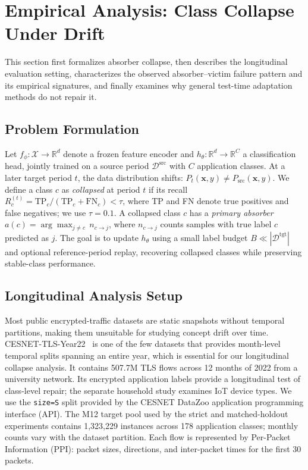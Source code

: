 \documentclass[journal]{IEEEtran}
\begin{document}
\section{Empirical Analysis: Class Collapse Under Drift}
\label{sec:analysis}

This section first formalizes absorber collapse, then describes the longitudinal evaluation setting, characterizes the observed absorber--victim failure pattern and its empirical signatures, and finally examines why general test-time adaptation methods do not repair it.

\subsection{Problem Formulation}
\label{sec:problem}

Let $f_\phi: \mathcal{X} \to \mathbb{R}^d$ denote a frozen feature encoder and $h_\theta: \mathbb{R}^d \to \mathbb{R}^C$ a classification head, jointly trained on a source period $\mathcal{D}^{\text{src}}$ with $C$ application classes.
At a later target period $t$, the data distribution shifts: $P_t(\mathbf{x}, y) \neq P_{\text{src}}(\mathbf{x}, y)$.
We define a class $c$ as \textit{collapsed} at period $t$ if its recall $R_c^{(t)} = \text{TP}_c / ({\text{TP}_c + \text{FN}_c}) < \tau$, where TP and FN denote true positives and false negatives; we use $\tau{=}0.1$.
A collapsed class $c$ has a \textit{primary absorber} $a(c) = \arg\max_{j \neq c}\, n_{c \to j}$, where $n_{c \to j}$ counts samples with true label $c$ predicted as $j$.
The goal is to update $h_\theta$ using a small label budget $B \ll |\mathcal{D}^{\text{tgt}}|$ and optional reference-period replay, recovering collapsed classes while preserving stable-class performance.

\subsection{Longitudinal Analysis Setup}
\label{sec:setup_analysis}

Most public encrypted-traffic datasets are static snapshots without temporal partitions, making them unsuitable for studying concept drift over time.
CESNET-TLS-Year22~\cite{hynek2024cesnet} is one of the few datasets that provides month-level temporal splits spanning an entire year, which is essential for our longitudinal collapse analysis.
It contains 507.7M TLS flows across 12 months of 2022 from a university network. Its encrypted application labels provide a longitudinal test of class-level repair; the separate household study examines IoT device types.
We use the \texttt{size=S} split provided by the CESNET DataZoo application programming interface (API). The M12 target pool used by the strict and matched-holdout experiments contains 1{,}323{,}229 instances across 178 application classes; monthly counts vary with the dataset partition.
Each flow is represented by Per-Packet Information (PPI): packet sizes, directions, and inter-packet times for the first 30 packets.
\end{document}
